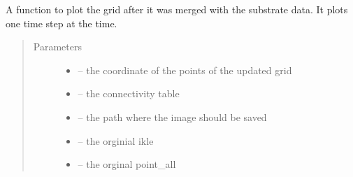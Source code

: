 \documentclass[letterpaper,10pt,english]{sphinxmanual}
\begin{document}
\begin{fulllineitems}
\label{\detokenize{index:src.mesh_grid2.fig_merge_grid}}
A function to plot the grid after it was merged with the substrate data.
It plots one time step at the time.
\begin{quote}\begin{description}
\item[{Parameters}] \leavevmode\begin{itemize}
\item {} 
 -- the coordinate of the points of the updated grid

\item {} 
 -- the connectivity table

\item {} 
 -- the path where the image should be saved

\item {} 
 -- the orginial ikle

\item {} 
 -- the orginal point\_all

\end{itemize}

\end{description}\end{quote}

\end{fulllineitems}

\end{document}
